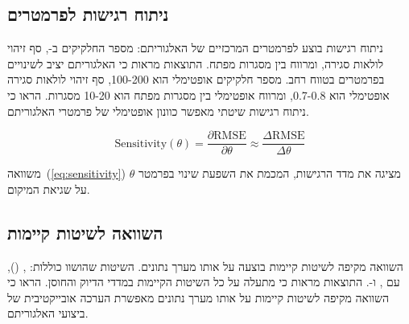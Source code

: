 \subsection{ניתוח רגישות לפרמטרים}
\label{sec:sensitivity_analysis}

ניתוח רגישות בוצע לפרמטרים המרכזיים של האלגוריתם: מספר החלקיקים ב-, סף זיהוי לולאות סגירה, ומרווח בין מסגרות מפתח. התוצאות מראות כי האלגוריתם יציב לשינויים בפרמטרים בטווח רחב. מספר חלקיקים אופטימלי הוא 100-200, סף זיהוי לולאות סגירה אופטימלי הוא 0.7-0.8, ומרווח אופטימלי בין מסגרות מפתח הוא 10-20 מסגרות. \citet{Thrun2005ProbRobotics} הראו כי ניתוח רגישות שיטתי מאפשר כוונון אופטימלי של פרמטרי האלגוריתם.

\begin{equation}
\text{Sensitivity}(\theta) = \frac{\partial \text{RMSE}}{\partial \theta} \approx \frac{\Delta \text{RMSE}}{\Delta \theta}
\label{eq:sensitivity}
\end{equation}

משוואה~(\ref{eq:sensitivity}) מציגה את מדד הרגישות, המכמת את השפעת שינוי בפרמטר $\theta$ על שגיאת המיקום.

\subsection{השוואה לשיטות קיימות}
\label{sec:comparison_existing}

השוואה מקיפה לשיטות קיימות בוצעה על אותו מערך נתונים. השיטות שהושוו כוללות:  \cite{Thrun2005ProbRobotics},  (),  עם  \cite{Kaess2012}, ו-. התוצאות מראות כי  מתעלה על כל השיטות הקיימות במדדי הדיוק והחוסן. \citet{MurArtal2015ORB} הראו כי השוואה מקיפה לשיטות קיימות על אותו מערך נתונים מאפשרת הערכה אובייקטיבית של ביצועי האלגוריתם.

\begin{table}[htbp]
    \centering
    \caption{השוואה מקיפה לשיטות קיימות. (Comprehensive comparison with existing methods.)}
    \label{tab:comprehensive_comparison}
\end{table}

